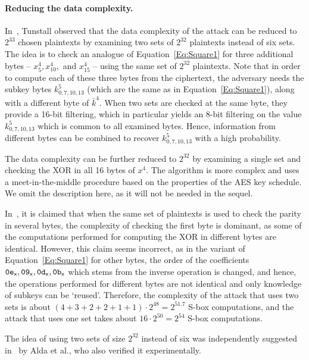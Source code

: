 \paragraph{Reducing the data complexity.} In~\cite{Tunstall12}, Tunstall observed that the data complexity of the attack can be reduced to $2^{33}$ chosen plaintexts by examining two sets of $2^{32}$ plaintexts instead of six sets. The idea is to check an analogue of Equation~\eqref{Eq:Square1} for three additional bytes -- $x^4_5, x^4_{10},$ and $x^4_{15}$ -- using the same set of $2^{32}$ plaintexts. Note that in order to compute each of these three bytes from the ciphertext, the adversary needs the subkey bytes $k^{5}_{0,7,10,13}$ (which are the same as in Equation~\eqref{Eq:Square1}), along with a different byte of $\bar{k}^4$. When two sets are checked at the same byte, they provide a 16-bit filtering, which in particular yields an 8-bit filtering on the value $k^{5}_{0,7,10,13}$ which is common to all examined bytes. Hence, information from different bytes can be combined to recover $k^5_{0,7,10,13}$ with a high probability. 

The data complexity can be further reduced to $2^{32}$ by examining a single set and checking the XOR in all 16 bytes of $x^4$. The algorithm is more complex and uses a meet-in-the-middle procedure based on the properties of the AES key schedule. We omit the description here, as it will not be needed in the sequel. 

In~\cite{Tunstall12}, it is claimed that when the same set of plaintexts is used to check the parity in several bytes, the complexity of checking the first byte is dominant, as some of the computations performed for computing the XOR in different bytes are identical. However, this claim seems incorrect, as in the variant of Equation~\eqref{Eq:Square1} for other bytes, the order of the coefficients 
$\mathtt{0e}_{\mathsf{x}},\mathtt{09}_{\mathsf{x}},\mathtt{0d}_{\mathsf{x}},\mathtt{0b}_{\mathsf{x}}$ which stems from the inverse \mc operation is changed, and hence, the operations performed for different bytes are not identical and only knowledge of subkeys can be `reused'. Therefore, the complexity of the attack that uses two sets is about $(4+3+2+2+1+1)\cdot 2^{48}=2^{51.7}$ S-box computations, and the attack that uses one set takes about $16 \cdot 2^{50}=2^{54}$ S-box computations.

The idea of using two sets of size $2^{32}$ instead of six was independently suggested in~\cite{alda2016implementation} by Alda et al., who also verified it experimentally.


